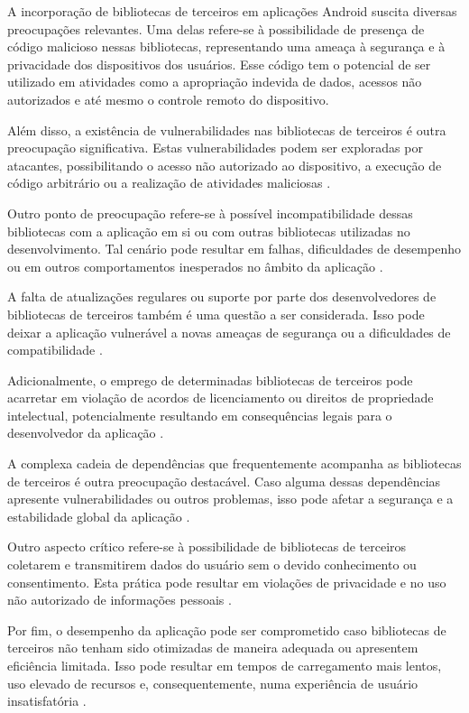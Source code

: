 A incorporação de bibliotecas de terceiros em aplicações Android suscita diversas preocupações relevantes. Uma delas refere-se à possibilidade de presença de código malicioso nessas bibliotecas, representando uma ameaça à segurança e à privacidade dos dispositivos dos usuários. Esse código tem o potencial de ser utilizado em atividades como a apropriação indevida de dados, acessos não autorizados e até mesmo o controle remoto do dispositivo. \cite{api_tpl_zhang}

Além disso, a existência de vulnerabilidades nas bibliotecas de terceiros é outra preocupação significativa. Estas vulnerabilidades podem ser exploradas por atacantes, possibilitando o acesso não autorizado ao dispositivo, a execução de código arbitrário ou a realização de atividades maliciosas \cite{api_tpl_zhang}.

Outro ponto de preocupação refere-se à possível incompatibilidade dessas bibliotecas com a aplicação em si ou com outras bibliotecas utilizadas no desenvolvimento. Tal cenário pode resultar em falhas, dificuldades de desempenho ou em outros comportamentos inesperados no âmbito da aplicação \cite{api_tpl_zhang}.

A falta de atualizações regulares ou suporte por parte dos desenvolvedores de bibliotecas de terceiros também é uma questão a ser considerada. Isso pode deixar a aplicação vulnerável a novas ameaças de segurança ou a dificuldades de compatibilidade \cite{api_tpl_zhang}.

Adicionalmente, o emprego de determinadas bibliotecas de terceiros pode acarretar em violação de acordos de licenciamento ou direitos de propriedade intelectual, potencialmente resultando em consequências legais para o desenvolvedor da aplicação \cite{api_tpl_zhang}.

A complexa cadeia de dependências que frequentemente acompanha as bibliotecas de terceiros é outra preocupação destacável. Caso alguma dessas dependências apresente vulnerabilidades ou outros problemas, isso pode afetar a segurança e a estabilidade global da aplicação \cite{api_tpl_zhang}.

Outro aspecto crítico refere-se à possibilidade de bibliotecas de terceiros coletarem e transmitirem dados do usuário sem o devido conhecimento ou consentimento. Esta prática pode resultar em violações de privacidade e no uso não autorizado de informações pessoais \cite{api_tpl_zhang}.

Por fim, o desempenho da aplicação pode ser comprometido caso bibliotecas de terceiros não tenham sido otimizadas de maneira adequada ou apresentem eficiência limitada. Isso pode resultar em tempos de carregamento mais lentos, uso elevado de recursos e, consequentemente, numa experiência de usuário insatisfatória \cite{api_tpl_zhang}.


